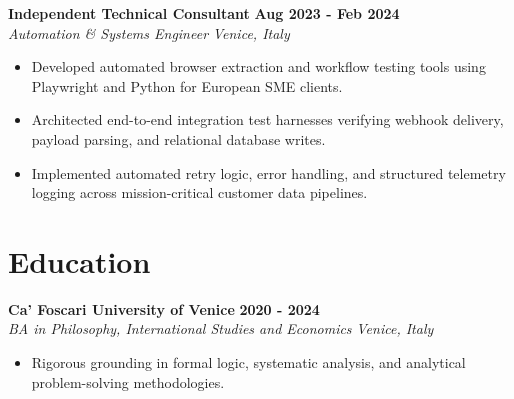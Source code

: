 \documentclass[10pt,a4paper]{article}
\newcommand{\role}[4]{%
  \textbf{#1} \hfill \textbf{#2}\\[1pt]%
  \textit{#3} \hfill \textit{#4}\\[2pt]%
}
\begin{document}
\role{Independent Technical Consultant}{Aug 2023 - Feb 2024}{Automation \& Systems Engineer}{Venice, Italy}
\begin{itemize}
  \item Developed automated browser extraction and workflow testing tools using Playwright and Python for European SME clients.
  \item Architected end-to-end integration test harnesses verifying webhook delivery, payload parsing, and relational database writes.
  \item Implemented automated retry logic, error handling, and structured telemetry logging across mission-critical customer data pipelines.
\end{itemize}

\section{Education}
\role{Ca' Foscari University of Venice}{2020 - 2024}{BA in Philosophy, International Studies and Economics}{Venice, Italy}
\begin{itemize}
  \item Rigorous grounding in formal logic, systematic analysis, and analytical problem-solving methodologies.
\end{itemize}
\end{document}

